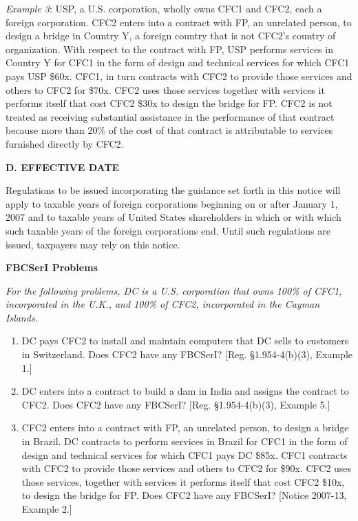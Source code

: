 \begin{select}
\emph{Example 3}: USP, a U.S. corporation, wholly owns CFC1 and CFC2, each a foreign corporation. CFC2 enters into a contract with FP, an unrelated person, to design a bridge in Country Y, a foreign country that is not CFC2's country of organization. With respect to the contract with FP, USP performs services in Country Y for CFC1 in the form of design and technical services for which CFC1 pays USP \$60x. CFC1, in turn contracts with CFC2 to provide those services and others to CFC2 for \$70x. CFC2 uses those services together with services it performs itself that cost CFC2 \$30x to design the bridge for FP. CFC2 is not treated as receiving substantial assistance in the performance of that contract because more than 20\% of the cost of that contract is attributable to services furnished directly by CFC2.

\begin{center}
\textbf{D. EFFECTIVE DATE}
\end{center}
Regulations to be issued incorporating the guidance set forth in this notice will apply to taxable years of foreign corporations beginning on or after January 1, 2007 and to taxable years of United States shareholders in which or with which such taxable years of the foreign corporations end. Until such regulations are issued, taxpayers may rely on this notice.

\end{select}


	\begin{center}
		\textbf{FBCSerI Problems}
	\end{center}
	\begin{select}
	\emph{For the following problems, DC is a U.S. corporation that owns 100\% of CFC1, incorporated in the U.K., and 100\% of CFC2, incorporated in the Cayman Islands.}
			\begin{enumerate}
				\item DC pays CFC2 to install and maintain computers that DC sells to customers in Switzerland.  Does CFC2 have any FBCSerI?   [Reg. \S 1.954-4(b)(3), Example 1.]
				\item DC enters into a contract to build a dam in India and assigns the contract to CFC2.  Does CFC2 have any FBCSerI?   [Reg. \S 1.954-4(b)(3), Example 5.]
				\item CFC2 enters into a contract with FP, an unrelated person, to design a bridge in Brazil. DC contracts to perform services in Brazil for CFC1 in the form of design and technical services for which CFC1 pays DC \$85x. CFC1 contracts with CFC2 to provide those services and others to CFC2 for \$90x. CFC2 uses those services, together with services it performs itself that cost CFC2 \$10x, to design the bridge for FP.   Does CFC2 have any FBCSerI?   [Notice 2007-13, Example 2.]
			\end{enumerate}
		\end{select} 	


